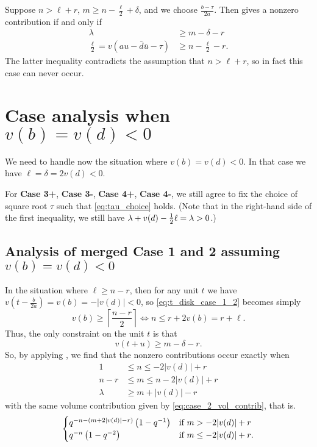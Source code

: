 \begin{description}
Suppose $n > \ell + r$,
$m \ge n - \frac{\ell}{2} + \delta$, and we choose $\frac{b-\tau}{2a}$.
Then  gives a nonzero contribution if and only if
\begin{align*}
  \lambda &\geq m - \delta - r \\
  \frac{\ell}{2} = v(au-\bar d \bar u - \tau) & \geq n - \frac{\ell}{2} - r.
\end{align*}
The latter inequality contradicts the assumption that $n > \ell + r$,
so in fact this case can never occur.
\end{description}

\section{Case analysis when $v(b) = v(d) < 0$}
We need to handle now the situation where $v(b) = v(d) < 0$.
In that case we have $\ell = \delta = 2v(d) < 0$.

For \textbf{Case 3\ts+}, \textbf{Case 3\ts-}, \textbf{Case 4\ts+}, \textbf{Case 4\ts-},
we still agree to fix the choice of square root $\tau$ such that
\eqref{eq:tau_choice} holds.
(Note that in the right-hand side of the first inequality,
we still have $\lambda + v(d) - \frac{1}{2} \ell = \lambda > 0$.)

\subsection{Analysis of merged Case 1 and 2 assuming $v(b) = v(d) < 0$}
In the situation where $\ell \ge n - r$,
then for any unit $t$ we have $v(t-\frac{b}{2a}) = v(b) = -|v(d)| < 0$,
so \eqref{eq:t_disk_case_1_2} becomes simply
\[ v(b) \ge \left\lceil \frac{n-r}{2} \right\rceil \iff n \le r + 2 v(b) = r + \ell. \]
Thus, the only constraint on the unit $t$ is that
\[ v(t + u) \ge m - \delta - r. \]
So, by applying , we find that the nonzero contributions occur exactly when
\begin{equation}
  \begin{aligned}
    1 &\le n \le -2|v(d)| + r \\
    n-r &\le m \le n - 2|v(d)| + r \\
    \lambda &\ge m + |v(d)| - r
  \end{aligned}
  \label{eq:ell_neg_12_range}
\end{equation}
with the same volume contribution given by \eqref{eq:case_2_vol_contrib}, that is.
\begin{equation}
  \begin{cases}
    q^{-n - (m+2|v(d)|-r)} \left( 1 - q^{-1} \right)
      & \text{if $m > -2|v(d)| + r$} \\
    q^{-n} \left( 1 - q^{-2} \right)
      & \text{if $m \le -2|v(d)| + r$}.
  \end{cases}
  \label{eq:ell_neg_12_vol}
\end{equation}

